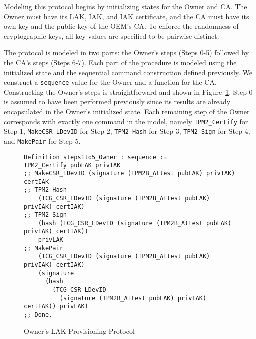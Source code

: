 \documentclass[runningheads]{llncs}
\begin{document}
Modeling this protocol begins by initializing states for the Owner and
CA. The Owner must have its LAK, IAK, and IAK certificate, and the CA
must have its own key and the public key of the OEM's CA.  
To enforce the randomness of cryptographic
keys, all key values are specified to be pairwise distinct.




The protocol is modeled in two parts: the Owner's steps (Steps 0-5)
followed by the CA's steps (Steps 6-7).  Each part of the procedure is
modeled using the initialized state and the sequential command
construction defined previously.  We construct a \verb|sequence| value
for the Owner and a function for the CA. Constructing the Owner's
steps is straightforward and shown in
Figure~\ref{fig:lak_model_Owner}. Step 0 is assumed to have been
performed previously since its results are already encapsulated in the
Owner's initialized state.  Each remaining step of the Owner
corresponds with exactly one command in the model, namely
\verb|TPM2_Certify| for Step 1, \verb|MakeCSR_LDevID| for Step 2,
\verb|TPM2_Hash| for Step 3, \verb|TPM2_Sign| for Step 4, and
\verb|MakePair| for Step 5.

\begin{figure}[hpbt]
\begin{lstlisting}[language=Coq]
Definition steps1to5_Owner : sequence :=
TPM2_Certify pubLAK privIAK
;; MakeCSR_LDevID (signature (TPM2B_Attest pubLAK) privIAK) certIAK
;; TPM2_Hash
    (TCG_CSR_LDevID (signature (TPM2B_Attest pubLAK) privIAK) certIAK)
;; TPM2_Sign 
    (hash (TCG_CSR_LDevID (signature (TPM2B_Attest pubLAK) privIAK) certIAK))
    privLAK
;; MakePair 
    (TCG_CSR_LDevID (signature (TPM2B_Attest pubLAK) privIAK) certIAK) 
    (signature
      (hash
        (TCG_CSR_LDevID
          (signature (TPM2B_Attest pubLAK) privIAK) certIAK)) privLAK)
;; Done. 
\end{lstlisting}
\caption{Owner's LAK Provisioning Protocol}
\label{fig:lak_model_Owner}
\end{figure}
\end{document}
